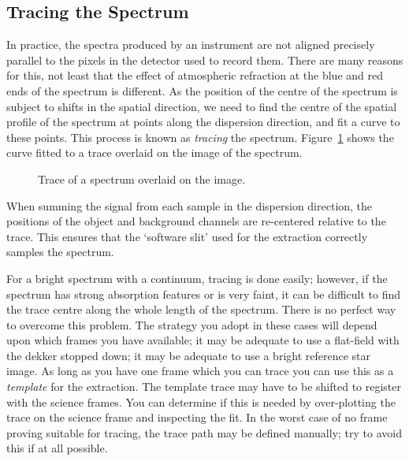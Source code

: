 \documentclass[twoside,11pt]{article}
\newcommand{\htmlref}[2]{#1}
\newcommand{\xlabel}[1]{}
\newcommand{\mlabel}[1]{\xlabel{#1}\label{#1}}
\newcommand{\scspec}[2]{#1}
\newcommand{\scspec}[2]{#2}
\begin{document}
\subsection{\mlabel{tracing}Tracing the Spectrum}

In practice, the spectra produced by an instrument are not aligned
precisely parallel to the pixels in the detector used to record them.
There are many reasons for this, not least that the effect of
atmospheric refraction at the blue and red ends of the spectrum is
different.
As the position of the centre of the spectrum is subject to shifts in the
spatial direction, we need to find the centre of the spatial profile of
the spectrum at points along the dispersion direction, and fit
a curve to these points.
This process is known as {\em tracing} the spectrum.
\scspec{Figure~\ref{fi_order_trace}}{The figure below} shows the
curve fitted to a trace overlaid on the image of the spectrum.

\begin{figure}
\begin{center}
  \scspec{\leavevmode\epsfysize=105mm\epsfbox{sc7_05.eps}}
         {\leavevmode\epsfysize=136mm}

  \parbox{140mm}{
    \caption{Trace of a spectrum overlaid on the image.}
    \label{fi_order_trace}
  }
\end{center}
\end{figure}

When summing the signal from each sample in the dispersion direction, the
positions of the object and background channels are re-centered relative to
the trace.  This ensures that the `software slit' used for the extraction
correctly samples the spectrum.

For a bright spectrum with a \htmlref{continuum}{gl_continuum}, tracing is
done easily; however, if the spectrum has strong absorption features or is
very faint, it can be difficult to find the trace centre along the whole
length of the spectrum.
There is no perfect way to overcome this problem.
The strategy you adopt in these cases will depend upon which frames
you have available; it may be adequate to use a flat-field with the
\htmlref{dekker}{gl_dekker}
stopped down; it may be adequate to use a bright reference star image.
As long as you have one frame which you can trace you can use this
as a \htmlref{{\em template}}{gl_template_order} for the extraction.
The template trace may have to be shifted to register with the science frames.
You can determine if this is needed by over-plotting the trace on
the science frame and inspecting the fit.
In the worst case of no frame proving suitable for tracing, the trace
path may be defined manually; try to avoid this if at all possible.
\end{document}
